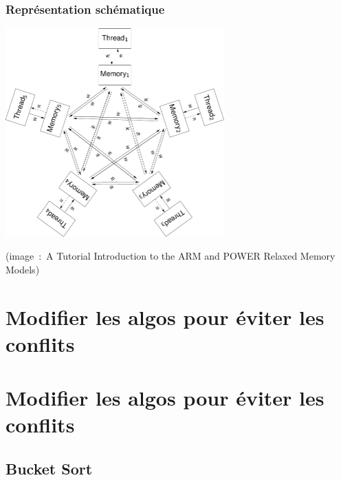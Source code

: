 \documentclass[xcolor={x11names,svgnames}]{beamer}
\begin{document}

\begin{frame}[label=pram]
  \frametitle{Représentation schématique}
  
  \centering
  \includegraphics[height=8cm]{pram_archi.pdf}
    \medskip
  
  \scriptsize (image~:~A Tutorial
    Introduction to the ARM and POWER Relaxed Memory Models)

\end{frame}





\section{Modifier les algos pour éviter les conflits}


\section{Modifier les algos pour éviter les conflits}


\subsection{Bucket Sort}

\end{document}
